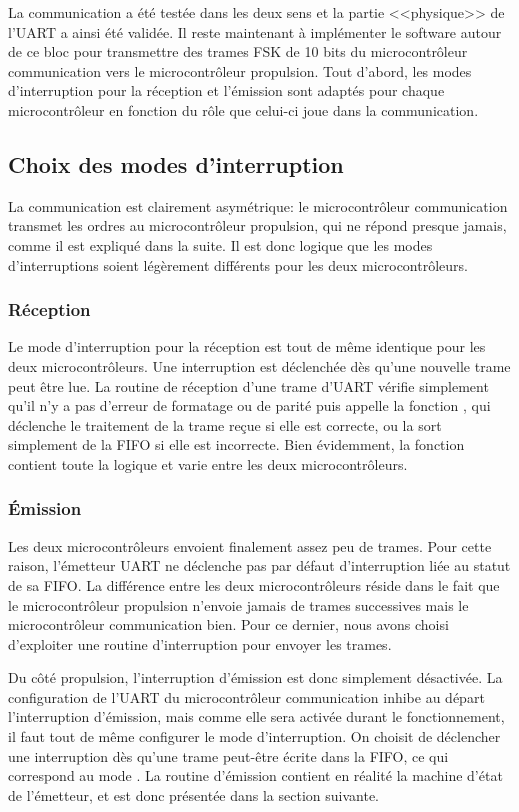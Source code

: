 La communication a été testée dans les deux sens et la partie <<physique>> de l'UART a ainsi été validée. Il reste maintenant à implémenter le software autour de ce bloc pour transmettre des trames FSK de 10 bits du microcontrôleur communication vers le microcontrôleur propulsion. Tout d'abord, les modes d'interruption pour la réception et l'émission sont adaptés pour chaque microcontrôleur en fonction du rôle que celui-ci joue dans la communication.

\subsection{Choix des modes d'interruption}
La communication est clairement asymétrique: le microcontrôleur communication transmet les ordres au microcontrôleur propulsion, qui ne répond presque jamais, comme il est expliqué dans la suite. Il est donc logique que les modes d'interruptions soient légèrement différents pour les deux microcontrôleurs.

\subsubsection{Réception}
Le mode d'interruption pour la réception est tout de même identique pour les deux microcontrôleurs. Une interruption est déclenchée dès qu'une nouvelle trame peut être lue. La routine de réception d'une trame d'UART vérifie simplement qu'il n'y a pas d'erreur de formatage ou de parité puis appelle la fonction , qui déclenche le traitement de la trame reçue si elle est correcte, ou la sort simplement de la FIFO si elle est incorrecte. Bien évidemment, la fonction  contient toute la logique et varie entre les deux microcontrôleurs.

\subsubsection{\'Emission}
Les deux microcontrôleurs envoient finalement assez peu de trames. Pour cette raison, l'émetteur UART ne déclenche pas par défaut d'interruption liée au statut de sa FIFO. La différence entre les deux microcontrôleurs réside dans le fait que le microcontrôleur propulsion n'envoie jamais de trames successives mais le microcontrôleur communication bien. Pour ce dernier, nous avons choisi d'exploiter une routine d'interruption pour envoyer les trames.

Du côté propulsion, l'interruption d'émission est donc simplement désactivée. La configuration de l'UART du microcontrôleur communication inhibe au départ l'interruption d'émission, mais comme elle sera activée durant le fonctionnement, il faut tout de même configurer le mode d'interruption. On choisit de déclencher une interruption dès qu'une trame peut-être écrite dans la FIFO, ce qui correspond au mode . La routine d'émission contient en réalité la machine d'état de l'émetteur, et est donc présentée dans la section suivante.

